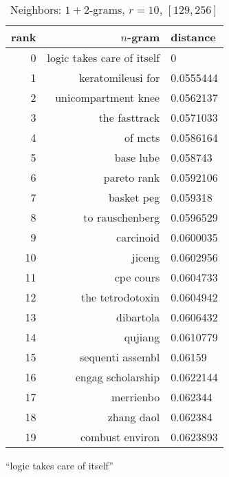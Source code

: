\begin{table}[t]
\begin{subtable}[t]{.45\textwidth}
        \centering
        \begin{tabularx}{\textwidth}{r R l}
            \toprule
            rank & $n$-gram & distance\\
            \midrule
            \num{0} & logic takes care of itself & \num{0}\\
            \num{1} & keratomileusi for & \num{0.0555444}\\
            \num{2} & unicompartment knee & \num{0.0562137}\\
            \num{3} & the fasttrack & \num{0.0571033}\\
            \num{4} & of mcts & \num{0.0586164}\\
            \num{5} & base lube & \num{0.058743}\\
            \num{6} & pareto rank & \num{0.0592106}\\
            \num{7} & basket peg & \num{0.059318}\\
            \num{8} & to rauschenberg & \num{0.0596529}\\
            \num{9} & carcinoid & \num{0.0600035}\\
            \num{10} & jiceng & \num{0.0602956}\\
            \num{11} & cpe cours & \num{0.0604733}\\
            \num{12} & the tetrodotoxin & \num{0.0604942}\\
            \midrule
            \num{13} & dibartola & \num{0.0606432}\\
            \num{14} & qujiang & \num{0.0610779}\\
            \num{15} & sequenti assembl & \num{0.06159}\\
            \num{16} & engag scholarship & \num{0.0622144}\\
            \num{17} & merrienbo & \num{0.062344}\\
            \num{18} & zhang daol & \num{0.062384}\\
            \num{19} & combust environ & \num{0.0623893}\\
            \bottomrule
        \end{tabularx}
        \caption{\enquote{logic takes care of itself}}\label{tab:ranking_chance_2}
    \end{subtable}
    \caption[Neighbors of longer $n$-grams]{Neighbors: $1+2$-grams, $r = 10$, $[129,256]$}\label{tab:ranking_chance}
\end{table}

